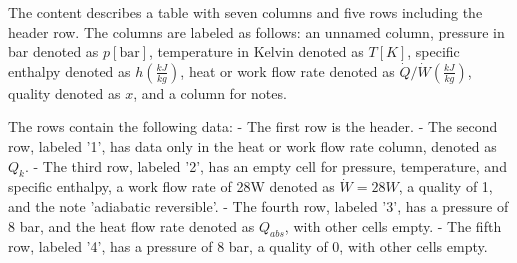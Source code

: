 The content describes a table with seven columns and five rows including the header row. The columns are labeled as follows: an unnamed column, pressure in bar denoted as \( p[\text{bar}] \), temperature in Kelvin denoted as \( T[K] \), specific enthalpy denoted as \( h\left(\frac{kJ}{kg}\right) \), heat or work flow rate denoted as \( \dot{Q}/\dot{W}\left(\frac{kJ}{kg}\right) \), quality denoted as \( x \), and a column for notes.

The rows contain the following data:
- The first row is the header.
- The second row, labeled '1', has data only in the heat or work flow rate column, denoted as \( Q_k \).
- The third row, labeled '2', has an empty cell for pressure, temperature, and specific enthalpy, a work flow rate of 28W denoted as \( \dot{W} = 28W \), a quality of 1, and the note 'adiabatic reversible'.
- The fourth row, labeled '3', has a pressure of 8 bar, and the heat flow rate denoted as \( Q_{abs} \), with other cells empty.
- The fifth row, labeled '4', has a pressure of 8 bar, a quality of 0, with other cells empty.